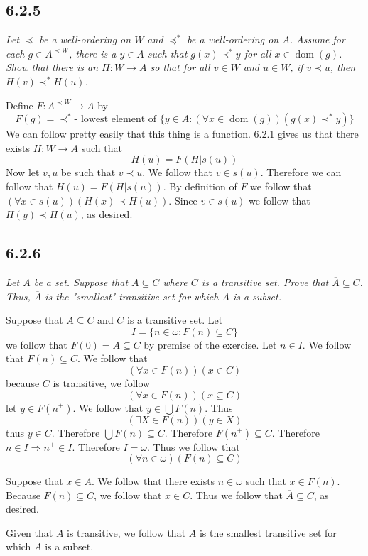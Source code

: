 \documentclass[11pt,oneside,titlepage]{book}
\DeclareMathOperator \ra {\Rightarrow}
\DeclareMathOperator \dom {dom}
\begin{document}
\subsection*{6.2.5}

\textit{Let $\preceq$ be a well-ordering on $W$ and $\preceq^*$ be a well-ordering on $A$.
  Assume for each $g \in A^{\prec W}$, there is a $y \in A$ such that $g(x) \prec^* y$ for
  all $x \in \dom(g)$. Show that there is an $H: W \to A$ so that for all $v \in W$ and
  $u \in W$, if $v \prec u$, then $H(v) \prec^* H(u)$.}

Define $F: A^{\prec W} \to A$ by
$$F(g) = \prec^*\text{- lowest element of
  $\{y \in A: (\forall x \in \dom(g))(g(x) \prec^* y)\}$}$$
We can follow pretty easily that this thing is a function. 6.2.1 gives us that there exists
$H: W \to A$ such that
$$H(u) = F(H|s(u))$$
Now let $v, u$ be such that $v \prec u$. We follow that $v \in s(u)$. Therefore
we can follow that $H(u) = F(H|s(u))$. By definition of $F$ we follow that
$(\forall x \in s(u))(H(x) \prec H(u))$. Since $v \in s(u)$ we follow that
$H(y) \prec H(u)$, as desired.

\subsection*{6.2.6}

\textit{Let $A$ be a set. Suppose that $A \subseteq C$ where $C$ is a transitive set.
  Prove that $\overline{A} \subseteq C$. Thus, $\overline{A}$ is the "smallest"
  transitive set for which $A$ is a subset.}

Suppose that $A \subseteq C$ and $C$ is a transitive set.
Let
$$I = \{n \in \omega: F(n) \subseteq C\}$$
we follow that $F(0) = A \subseteq C$ by premise of the exercise. Let $n \in I$.
We follow that $F(n) \subseteq C$. We follow that
$$(\forall x \in F(n))(x \in C)$$
because $C$ is transitive, we follow
$$(\forall x \in F(n))(x \subseteq C)$$
let $y \in F(n^+)$. We follow that $y \in \bigcup{F(n)}$. Thus
$$(\exists X \in F(n))(y \in X)$$
thus $y \in C$. Therefore $\bigcup{F(n)} \subseteq C$. Therefore $F(n^+) \subseteq C$.
Therefore $n \in I \ra n^+ \in I$. Therefore $I = \omega$. Thus we follow that
$$(\forall n \in \omega)(F(n) \subseteq C)$$

Suppose that $x \in \overline{A}$. We follow that there exists $n \in \omega$ such that
$x \in F(n)$. Because $F(n) \subseteq C$, we follow that $x \in C$. Thus we follow that
$\overline{A} \subseteq C$, as desired.

Given that $\overline{A}$ is transitive, we follow that $\overline{A}$ is the smallest
transitive set for which $A$ is a subset.
\end{document}
